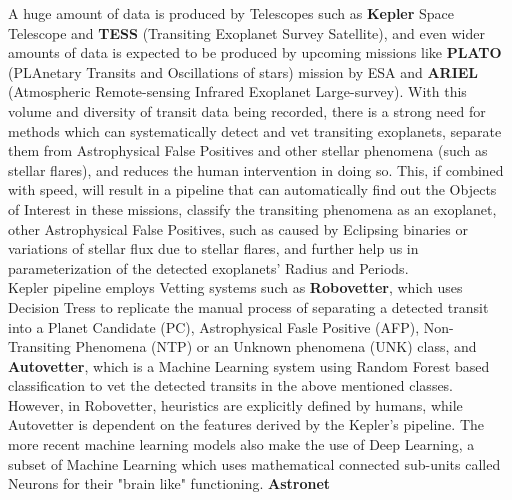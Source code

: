 






A huge amount of data is produced by Telescopes such as \textbf{Kepler} Space Telescope and \textbf{TESS} (Transiting Exoplanet Survey Satellite), and even wider amounts of data is expected to be produced by upcoming missions like \textbf{PLATO} (PLAnetary Transits and Oscillations of stars) mission by ESA and \textbf{ARIEL} (Atmospheric Remote-sensing Infrared Exoplanet Large-survey). With this volume and diversity of transit data being recorded, there is a strong need for methods which can systematically detect and vet transiting exoplanets, separate them from Astrophysical False Positives and other stellar phenomena (such as stellar flares), and reduces the human intervention in doing so. This, if combined with speed, will result in a pipeline that can automatically find out the Objects of Interest in these missions, classify the transiting phenomena as an exoplanet, other Astrophysical False Positives, such as caused by Eclipsing binaries or variations of stellar flux due to stellar flares, and further help us in parameterization of the detected exoplanets' Radius and Periods.\\

Kepler pipeline employs Vetting systems such as \textbf{Robovetter}, which uses Decision Tress to replicate the manual process of separating a detected transit into a Planet Candidate (PC), Astrophysical Fasle Positive (AFP), Non-Transiting Phenomena (NTP) or an Unknown phenomena (UNK) class, and \textbf{Autovetter}, which is a Machine Learning system using Random Forest based classification to vet the detected transits in the above mentioned classes. However, in Robovetter, heuristics are explicitly defined by humans, while Autovetter is dependent on the features derived by the Kepler's pipeline. The more recent machine learning models also make the use of Deep Learning, a subset of Machine Learning which uses mathematical connected sub-units called Neurons for their "brain like" functioning. \textbf{Astronet}